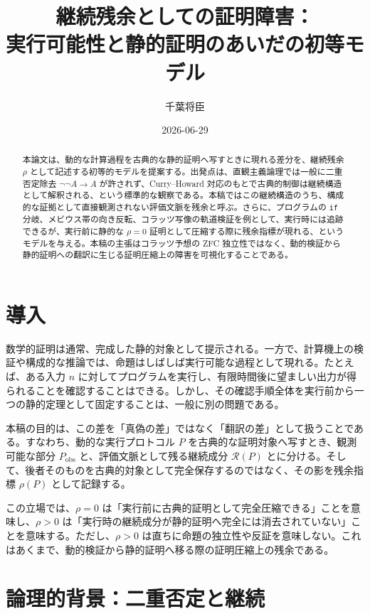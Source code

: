 \documentclass[11pt,a4paper,ja=standard,autodetect-engine]{bxjsarticle}
\title{継続残余としての証明障害：\\ 実行可能性と静的証明のあいだの初等モデル}
\author{千葉将臣}
\date{2026\mbox{-}06\mbox{-}29}
\begin{document}
\maketitle

\begin{abstract}
本論文は、動的な計算過程を古典的な静的証明へ写すときに現れる差分を、継続残余 $\rho$ として記述する初等的モデルを提案する。出発点は、直観主義論理では一般に二重否定除去 $\neg\neg A\to A$ が許されず、Curry\mbox{--}Howard 対応のもとで古典的制御は継続構造として解釈される、という標準的な観察である。本稿ではこの継続構造のうち、構成的な証拠として直接観測されない評価文脈を残余と呼ぶ。さらに、プログラムの \texttt{if} 分岐、メビウス帯の向き反転、コラッツ写像の軌道検証を例として、実行時には追跡できるが、実行前に静的な $\rho=0$ 証明として圧縮する際に残余指標が現れる、というモデルを与える。本稿の主張はコラッツ予想の ZFC 独立性ではなく、動的検証から静的証明への翻訳に生じる証明圧縮上の障害を可視化することである。
\end{abstract}

\section{導入}

数学的証明は通常、完成した静的対象として提示される。一方で、計算機上の検証や構成的な推論では、命題はしばしば実行可能な過程として現れる。たとえば、ある入力 $n$ に対してプログラムを実行し、有限時間後に望ましい出力が得られることを確認することはできる。しかし、その確認手順全体を実行前から一つの静的定理として固定することは、一般に別の問題である。

本稿の目的は、この差を「真偽の差」ではなく「翻訳の差」として扱うことである。すなわち、動的な実行プロトコル $P$ を古典的な証明対象へ写すとき、観測可能な部分 $P_{\mathrm{obs}}$ と、評価文脈として残る継続成分 $\mathcal{R}(P)$ とに分ける。そして、後者そのものを古典的対象として完全保存するのではなく、その影を残余指標 $\rho(P)$ として記録する。

この立場では、$\rho=0$ は「実行前に古典的証明として完全圧縮できる」ことを意味し、$\rho>0$ は「実行時の継続成分が静的証明へ完全には消去されていない」ことを意味する。ただし、$\rho>0$ は直ちに命題の独立性や反証を意味しない。これはあくまで、動的検証から静的証明へ移る際の証明圧縮上の残余である。

\section{論理的背景：二重否定と継続}
\end{document}

